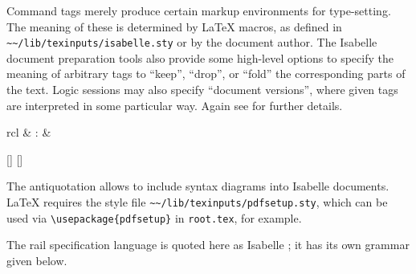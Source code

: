 \begin{isabellebody}
\begin{isamarkuptext}
  \medskip Command tags merely produce certain markup environments for
  type-setting.  The meaning of these is determined by {\LaTeX}
  macros, as defined in \verb|~~/lib/texinputs/isabelle.sty| or
  by the document author.  The Isabelle document preparation tools
  also provide some high-level options to specify the meaning of
  arbitrary tags to ``keep'', ``drop'', or ``fold'' the corresponding
  parts of the text.  Logic sessions may also specify ``document
  versions'', where given tags are interpreted in some particular way.
  Again see \cite{isabelle-sys} for further details.%
\end{isamarkuptext}%
\isamarkuptrue%
%
\isamarkuptrue%
%
\begin{isamarkuptext}%
\begin{matharray}{rcl}
    \hypertarget{antiquotation.rail}{\hyperlink{antiquotation.rail}{\mbox{}}} & : &  \\
  \end{matharray}

  \begin{railoutput}
[]
[]
\rail@end
\end{railoutput}


  The \hyperlink{antiquotation.rail}{\mbox{}} antiquotation allows to include syntax
  diagrams into Isabelle documents.  {\LaTeX} requires the style file
  \verb|~~/lib/texinputs/pdfsetup.sty|, which can be used via
  \verb|\usepackage{pdfsetup}| in \verb|root.tex|, for
  example.

  The rail specification language is quoted here as Isabelle \hyperlink{syntax.string}{\mbox{}}; it has its own grammar given below.


\end{isamarkuptext}
\end{isabellebody}
